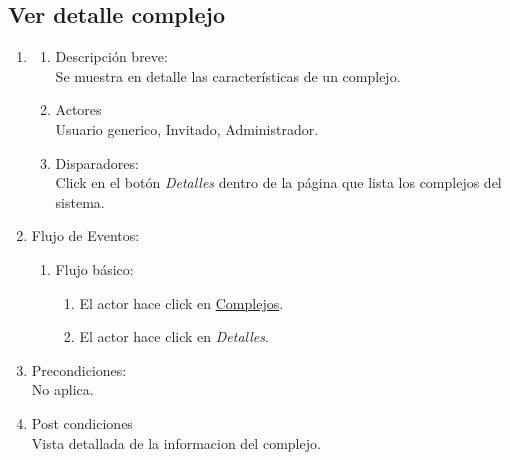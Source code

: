 \documentclass[a4paper,11pt]{article}
\begin{document}
\subsection{Ver detalle complejo}
\begin{enumerate}

    \item
    \begin{enumerate}
    \item Descripción breve: \\
        Se muestra en detalle las características de un complejo.
    \item Actores \\
        Usuario generico, Invitado, Administrador.
   \item Disparadores: \\
        Click en el botón \emph{Detalles} dentro de la
        página que lista los complejos del sistema.
    \end{enumerate}

    \item Flujo de Eventos:

    \begin{enumerate}

        \item Flujo básico:
	\begin{enumerate}
        	\item El actor hace click en \underline{Complejos}. 
		\item El actor hace click en \emph{Detalles}.
	\end{enumerate}

    \end{enumerate}

    \item Precondiciones: \\
        No aplica.

    \item Post condiciones \\
        Vista detallada de la informacion del complejo.

\end{enumerate}

\end{document}

